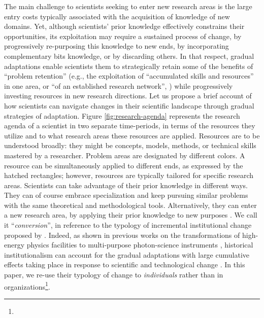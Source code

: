 \documentclass{article}
\begin{document}
The main challenge to scientists seeking to enter new research areas is the large entry costs typically associated with the acquisition of knowledge of new domains. Yet, although scientists' prior knowledge effectively constrains their opportunities, its exploitation may require a sustained process of change, by progressively re-purposing this knowledge to new ends, by incorporating complementary bits knowledge, or by discarding others. In that respect, gradual adaptations enable scientists them to strategically retain some of  the benefits of ``problem retention'' (e.g., the exploitation of ``accumulated skills and resources'' in one area, or ``of an established research network'', \citealt[p.~106]{Gieryn1978}) while progressively investing resources in new research directions. Let us propose a brief account of how scientists can navigate changes in their scientific landscape through gradual strategies of adaptation. Figure \ref{fig:research-agenda} %
represents the research agenda of a scientist in two separate time-periods, in terms of the resources they utilize and to what research areas these resources are applied. Resources are to be understood broadly: they might be concepts, models, methods, or technical skills mastered by a researcher. Problem areas are designated by different colors. A resource can be simultaneously applied to different ends, as expressed by the hatched rectangles; however, resources are typically tailored for specific research areas. Scientists can take advantage of their prior knowledge in different ways. They can of course embrace specialization and keep pursuing similar problems with the same theoretical and methodological tools.  
Alternatively, they can enter a new research area, by applying their prior knowledge to new purposes \citep{Mulkay1974,schon1963displacement}. We call it ``\textit{conversion}'', in reference to the typology of incremental institutional change proposed by \citet{mahoney_thelen_2009}. Indeed, as shown in previous works on the transformations of high-energy physics facilities to multi-purpose photon-science instruments  \citep{Hallonsten2013,Heinze2017a}, historical institutionalism can account for the gradual adaptations with large cumulative effects taking place in response to scientific and technological change \citep{Heinze2012}. In this paper, we re-use their typology of change to  \textit{individuals} rather than in organizations\footnote{}. 
\end{document}
